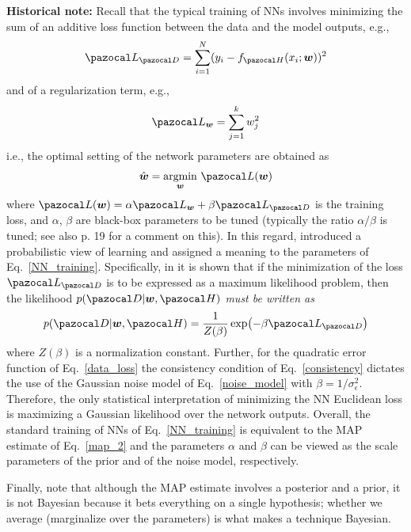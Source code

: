 \textbf{Historical note:}
Recall that the typical training of NNs involves minimizing the sum of an additive loss function between the data and the model outputs, e.g., 
\begin{equation}\label{data_loss}
\cL_{\cD} = \sum_{i=1}^{N}(y_i-f_{\cH}(x_i;\bw))^2
\end{equation}
and of a regularization term, e.g., 
\begin{equation}\label{prior_loss}
\cL_{\bw} = \sum_{j=1}^{k}w_j^2
\end{equation}
i.e., the optimal setting of the network parameters are obtained as
\begin{equation}\label{NN_training}
\hat{\bw} = \underset{\bw}{\mathrm{argmin}}~\cL(\bw)
\end{equation}
where $\cL(\bw) = \alpha \cL_{\bw} + \beta \cL_{\cD}$ is the training loss, and $\alpha$, $\beta$ are black-box parameters to be tuned (typically the ratio $\alpha/\beta$ is tuned; see also \cite{mackay1995probable} p. 19 for a comment on this).
In this regard, \textcite{tishby1989consistent} introduced a probabilistic view of learning and assigned a meaning to the parameters of Eq.~\eqref{NN_training}. 
Specifically, in \textcite{tishby1989consistent} it is shown that if the minimization of the loss $\cL_{\cD}$ is to be expressed as a maximum likelihood problem, then the likelihood $p(\cD|\bw,\cH)$ \textit{must be written as}
\begin{equation}\label{consistency}
p(\cD|\bw,\cH) = \frac{1}{Z(\beta)}\exp(-\beta \cL_{\cD})
\end{equation} 
where $Z(\beta)$ is a normalization constant. 
Further, for the quadratic error function of Eq.~\eqref{data_loss} the consistency condition of Eq.~\eqref{consistency} dictates the use of the Gaussian noise model of Eq.~\eqref{noise_model} with $\beta=1/\sigma_{\epsilon}^2$.
Therefore, the only statistical interpretation of minimizing the NN Euclidean loss is maximizing a Gaussian likelihood over the network outputs. 
Overall, the standard training of NNs of Eq.~\eqref{NN_training} is equivalent to the MAP estimate of Eq.~\eqref{map_2} and the parameters $\alpha$ and $\beta$ can be viewed as the scale parameters of the prior and of the noise model, respectively.

Finally, note that although the MAP estimate involves a posterior and a prior, it is not Bayesian because it bets everything on a single hypothesis; whether we average (marginalize over the parameters) is what makes a technique Bayesian.

